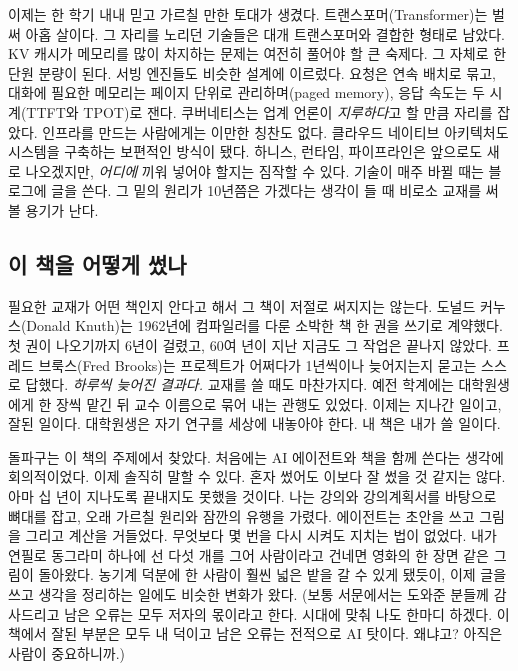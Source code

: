 이제는 한 학기 내내 믿고 가르칠 만한 토대가 생겼다. 트랜스포머(Transformer)는 벌써 아홉 살이다. 그 자리를 노리던 기술들은 대개 트랜스포머와 결합한 형태로 남았다. KV 캐시가 메모리를 많이 차지하는 문제는 여전히 풀어야 할 큰 숙제다. 그 자체로 한 단원 분량이 된다. 서빙 엔진들도 비슷한 설계에 이르렀다. 요청은 연속 배치로 묶고, 대화에 필요한 메모리는 페이지 단위로 관리하며(paged memory), 응답 속도는 두 시계(TTFT와 TPOT)로 잰다. 쿠버네티스는 업계 언론이 \textit{지루하다}고 할 만큼 자리를 잡았다. 인프라를 만드는 사람에게는 이만한 칭찬도 없다. 클라우드 네이티브 아키텍처도 시스템을 구축하는 보편적인 방식이 됐다. 하니스, 런타임, 파이프라인은 앞으로도 새로 나오겠지만, \textit{어디에} 끼워 넣어야 할지는 짐작할 수 있다. 기술이 매주 바뀔 때는 블로그에 글을 쓴다. 그 밑의 원리가 10년쯤은 가겠다는 생각이 들 때 비로소 교재를 써 볼 용기가 난다.

\subsection*{이 책을 어떻게 썼나}

필요한 교재가 어떤 책인지 안다고 해서 그 책이 저절로 써지지는 않는다. 도널드 커누스(Donald Knuth)는 1962년에 컴파일러를 다룬 소박한 책 한 권을 쓰기로 계약했다. 첫 권이 나오기까지 6년이 걸렸고, 60여 년이 지난 지금도 그 작업은 끝나지 않았다. 프레드 브룩스(Fred Brooks)는 프로젝트가 어쩌다가 1년씩이나 늦어지는지 묻고는 스스로 답했다. \textit{하루씩 늦어진 결과다.} 교재를 쓸 때도 마찬가지다. 예전 학계에는 대학원생에게 한 장씩 맡긴 뒤 교수 이름으로 묶어 내는 관행도 있었다. 이제는 지나간 일이고, 잘된 일이다. 대학원생은 자기 연구를 세상에 내놓아야 한다. 내 책은 내가 쓸 일이다.

돌파구는 이 책의 주제에서 찾았다. 처음에는 AI 에이전트와 책을 함께 쓴다는 생각에 회의적이었다. 이제 솔직히 말할 수 있다. 혼자 썼어도 이보다 잘 썼을 것 같지는 않다. 아마 십 년이 지나도록 끝내지도 못했을 것이다. 나는 강의와 강의계획서를 바탕으로 뼈대를 잡고, 오래 가르칠 원리와 잠깐의 유행을 가렸다. 에이전트는 초안을 쓰고 그림을 그리고 계산을 거들었다. 무엇보다 몇 번을 다시 시켜도 지치는 법이 없었다. 내가 연필로 동그라미 하나에 선 다섯 개를 그어 사람이라고 건네면 영화의 한 장면 같은 그림이 돌아왔다. 농기계 덕분에 한 사람이 훨씬 넓은 밭을 갈 수 있게 됐듯이, 이제 글을 쓰고 생각을 정리하는 일에도 비슷한 변화가 왔다. (보통 서문에서는 도와준 분들께 감사드리고 남은 오류는 모두 저자의 몫이라고 한다. 시대에 맞춰 나도 한마디 하겠다. 이 책에서 잘된 부분은 모두 내 덕이고 남은 오류는 전적으로 AI 탓이다. 왜냐고? 아직은 사람이 중요하니까.)

